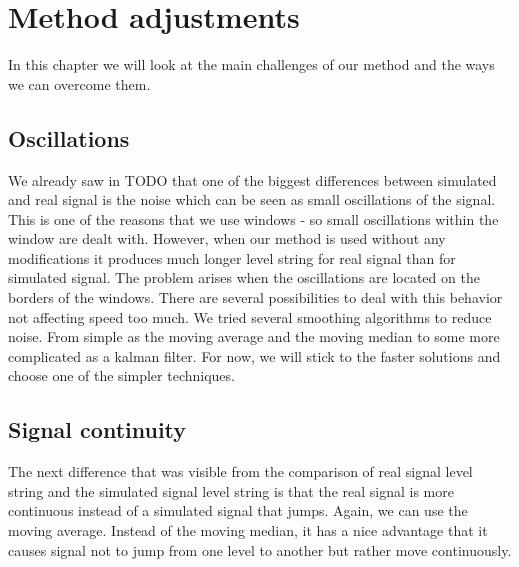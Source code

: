 \chapter{Method adjustments}

\label{kap:methAdjust} %

In this chapter we will look at the main challenges of our method and the ways
we can overcome them.

\section{Oscillations}

We already saw in TODO that one of the biggest differences between simulated and
real signal is the noise which can be seen as small oscillations of the signal. This is
one of the reasons that we use windows - so small oscillations within the window
are dealt with. However, when our method is used without any modifications it
produces much longer level string for real signal than for simulated signal.
The problem arises when the oscillations are located on the borders of the windows.
There are several possibilities to deal with this behavior not affecting speed too
much. We tried several smoothing algorithms to reduce noise. From simple as the
moving average and the moving median to some more complicated as a kalman filter.
For now, we will stick to the faster solutions and choose one of the simpler techniques.

\section{Signal continuity}

The next difference that was visible from the comparison of real signal level string
and the simulated signal level string is that the real signal is more continuous instead
of a simulated signal that jumps. Again, we can use the moving average. Instead of
the moving median, it has a nice advantage that it causes signal not to jump from
one level to another but rather move continuously.
